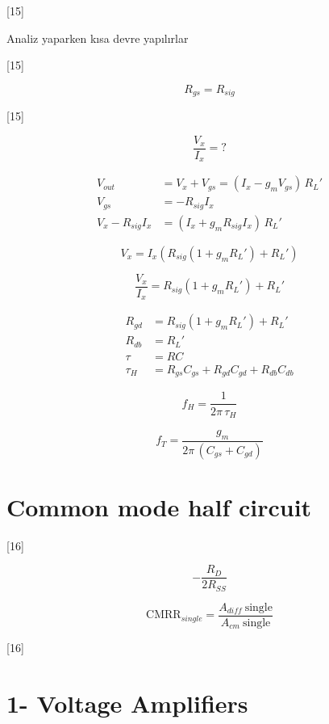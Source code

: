 \documentclass[11pt,a4paper]{article}
\begin{document}
[15]

\noindent Analiz yaparken kısa devre yapılırlar

[15]

\[ R_{gs} = R_{sig} \]

[15]

\[ \frac{V_x}{I_x} = ? \]

\begin{align*}
V_{out} &= V_x + V_{gs} = (I_x - g_m V_{gs})\,R_L'\\
V_{gs} &= -R_{sig} I_x\\
V_x - R_{sig} I_x &= (I_x + g_m R_{sig} I_x)\,R_L'
\end{align*}

\[ V_x = I_x\left( R_{sig}(1+g_m R_L') + R_L' \right) \]

\[ \frac{V_x}{I_x} = R_{sig}(1+g_m R_L') + R_L' \]

\begin{align*}
R_{gd} &= R_{sig}(1+g_m R_L') + R_L'\\
R_{db} &= R_L'\\
\tau &= RC\\
\tau_H &= R_{gs}C_{gs} + R_{gd}C_{gd} + R_{db}C_{db}
\end{align*}

\[ f_H = \frac{1}{2\pi\,\tau_H} \]

\[ f_T = \frac{g_m}{2\pi\,(C_{gs}+C_{gd})} \]


\section{Common mode half circuit}

[16]

\[ -\frac{R_D}{2R_{SS}} \]

\[ \mathrm{CMRR}_{single} = \frac{A_{diff}\ \text{single}}{A_{cm}\ \text{single}} \]

[16]

\section{1- Voltage Amplifiers}
\end{document}
